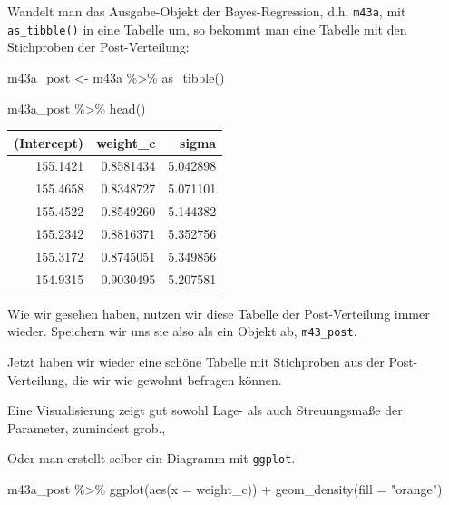 \documentclass[
  a4paper,
  DIV=11]{scrreprt}
\newenvironment{Shaded}{\begin{snugshade}}{\end{snugshade}}
\newcommand{\AttributeTok}[1]{\textcolor[rgb]{0.40,0.45,0.13}{#1}}
\newcommand{\FunctionTok}[1]{\textcolor[rgb]{0.28,0.35,0.67}{#1}}
\newcommand{\NormalTok}[1]{\textcolor[rgb]{0.00,0.23,0.31}{#1}}
\newcommand{\OtherTok}[1]{\textcolor[rgb]{0.00,0.23,0.31}{#1}}
\newcommand{\SpecialCharTok}[1]{\textcolor[rgb]{0.37,0.37,0.37}{#1}}
\newcommand{\StringTok}[1]{\textcolor[rgb]{0.13,0.47,0.30}{#1}}
\theoremstyle{definition}
\theoremstyle{remark}
\begin{document}
Wandelt man das Ausgabe-Objekt der Bayes-Regression, d.h. \texttt{m43a},
mit \texttt{as\_tibble()} in eine Tabelle um, so bekommt man eine
Tabelle mit den Stichproben der Post-Verteilung:

\begin{Shaded}
\begin{Highlighting}[]
\NormalTok{m43a\_post }\OtherTok{\textless{}{-}} 
\NormalTok{  m43a }\SpecialCharTok{\%\textgreater{}\%} 
  \FunctionTok{as\_tibble}\NormalTok{()}

\NormalTok{m43a\_post }\SpecialCharTok{\%\textgreater{}\%} 
  \FunctionTok{head}\NormalTok{()}
\end{Highlighting}
\end{Shaded}

\begin{longtable}[]{@{}rrr@{}}
\toprule()
(Intercept) & weight\_c & sigma \\
\midrule()
\endhead
155.1421 & 0.8581434 & 5.042898 \\
155.4658 & 0.8348727 & 5.071101 \\
155.4522 & 0.8549260 & 5.144382 \\
155.2342 & 0.8816371 & 5.352756 \\
155.3172 & 0.8745051 & 5.349856 \\
154.9315 & 0.9030495 & 5.207581 \\
\bottomrule()
\end{longtable}

Wie wir gesehen haben, nutzen wir diese Tabelle der Post-Verteilung
immer wieder. Speichern wir uns sie also als ein Objekt ab,
\texttt{m43\_post}.

Jetzt haben wir wieder eine schöne Tabelle mit Stichproben aus der
Post-Verteilung, die wir wie gewohnt befragen können.

Eine Visualisierung zeigt gut sowohl Lage- als auch Streuungsmaße der
Parameter, zumindest grob.,

Oder man erstellt selber ein Diagramm mit \texttt{ggplot}.

\begin{Shaded}
\begin{Highlighting}[]
\NormalTok{m43a\_post }\SpecialCharTok{\%\textgreater{}\%} 
  \FunctionTok{ggplot}\NormalTok{(}\FunctionTok{aes}\NormalTok{(}\AttributeTok{x =}\NormalTok{ weight\_c)) }\SpecialCharTok{+}
  \FunctionTok{geom\_density}\NormalTok{(}\AttributeTok{fill =} \StringTok{"orange"}\NormalTok{)}
\end{Highlighting}
\end{Shaded}
\end{document}
